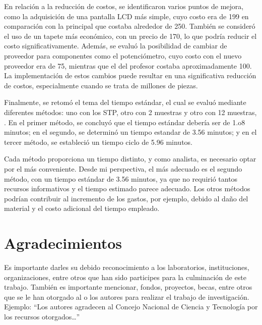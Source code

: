     En relación a la reducción de costos, se identificaron varios puntos de mejora, como la adquisición de una pantalla LCD más simple, cuyo costo era de 199 en comparación con la principal que costaba alrededor de 250. También se consideró el uso de un tapete más económico, con un precio de 170, lo que podría reducir el costo significativamente. Además, se evaluó la posibilidad de cambiar de proveedor para componentes como el potenciómetro, cuyo costo con el nuevo proveedor era de 75, mientras que el del profesor costaba aproximadamente 100. La implementación de estos cambios puede resultar en una significativa reducción de costos, especialmente cuando se trata de millones de piezas.
    
    Finalmente, se retomó el tema del tiempo estándar, el cual se evaluó mediante diferentes métodos: uno con los STP, otro con 2 muestras y otro con 12 muestras, . En el primer método, se concluyó que el tiempo estándar debería ser de 1.o8 minutos; en el segundo, se determinó un tiempo estandar de 3.56 minutos; y en el tercer método, se estableció un tiempo ciclo de 5.96 minutos.
    
    Cada método proporciona un tiempo distinto, y como analista, es necesario optar por el más conveniente. Desde mi perspectiva, el más adecuado es el segundo método, con un tiempo estándar de 3.56 minutos, ya que no requirió tantos recursos informativos y el tiempo estimado parece adecuado. Los otros métodos podrían contribuir al incremento de los gastos, por ejemplo, debido al daño del material y el costo adicional del tiempo empleado.
    
    \section{Agradecimientos}
    
    Es importante darles su debido reconocimiento a los laboratorios, instituciones, organizaciones, entre otros que han sido participes para la culminación de este trabajo. También es importante mencionar, fondos, proyectos, becas, entre otros que se le han otorgado al o los autores para realizar el trabajo de investigación. Ejemplo: “Los autores agradecen al Concejo Nacional de Ciencia y Tecnología por los recursos otorgados…”
    
    
